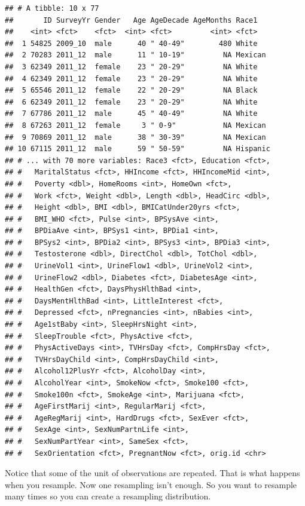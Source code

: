 \documentclass[
]{book}
\begin{document}
\begin{verbatim}
## # A tibble: 10 x 77
##       ID SurveyYr Gender   Age AgeDecade AgeMonths Race1   
##    <int> <fct>    <fct>  <int> <fct>         <int> <fct>   
##  1 54825 2009_10  male      40 " 40-49"        480 White   
##  2 70283 2011_12  male      11 " 10-19"         NA Mexican 
##  3 62349 2011_12  female    23 " 20-29"         NA White   
##  4 62349 2011_12  female    23 " 20-29"         NA White   
##  5 65546 2011_12  female    22 " 20-29"         NA Black   
##  6 62349 2011_12  female    23 " 20-29"         NA White   
##  7 67786 2011_12  male      45 " 40-49"         NA White   
##  8 67263 2011_12  female     3 " 0-9"           NA Mexican 
##  9 70869 2011_12  male      38 " 30-39"         NA Mexican 
## 10 67115 2011_12  male      59 " 50-59"         NA Hispanic
## # ... with 70 more variables: Race3 <fct>, Education <fct>,
## #   MaritalStatus <fct>, HHIncome <fct>, HHIncomeMid <int>,
## #   Poverty <dbl>, HomeRooms <int>, HomeOwn <fct>,
## #   Work <fct>, Weight <dbl>, Length <dbl>, HeadCirc <dbl>,
## #   Height <dbl>, BMI <dbl>, BMICatUnder20yrs <fct>,
## #   BMI_WHO <fct>, Pulse <int>, BPSysAve <int>,
## #   BPDiaAve <int>, BPSys1 <int>, BPDia1 <int>,
## #   BPSys2 <int>, BPDia2 <int>, BPSys3 <int>, BPDia3 <int>,
## #   Testosterone <dbl>, DirectChol <dbl>, TotChol <dbl>,
## #   UrineVol1 <int>, UrineFlow1 <dbl>, UrineVol2 <int>,
## #   UrineFlow2 <dbl>, Diabetes <fct>, DiabetesAge <int>,
## #   HealthGen <fct>, DaysPhysHlthBad <int>,
## #   DaysMentHlthBad <int>, LittleInterest <fct>,
## #   Depressed <fct>, nPregnancies <int>, nBabies <int>,
## #   Age1stBaby <int>, SleepHrsNight <int>,
## #   SleepTrouble <fct>, PhysActive <fct>,
## #   PhysActiveDays <int>, TVHrsDay <fct>, CompHrsDay <fct>,
## #   TVHrsDayChild <int>, CompHrsDayChild <int>,
## #   Alcohol12PlusYr <fct>, AlcoholDay <int>,
## #   AlcoholYear <int>, SmokeNow <fct>, Smoke100 <fct>,
## #   Smoke100n <fct>, SmokeAge <int>, Marijuana <fct>,
## #   AgeFirstMarij <int>, RegularMarij <fct>,
## #   AgeRegMarij <int>, HardDrugs <fct>, SexEver <fct>,
## #   SexAge <int>, SexNumPartnLife <int>,
## #   SexNumPartYear <int>, SameSex <fct>,
## #   SexOrientation <fct>, PregnantNow <fct>, orig.id <chr>
\end{verbatim}



Notice that some of the unit of observations are repeated. That is what happens when you resample. Now one resampling isn't enough. So you want to resample many times so you can create a resampling distribution.
\end{document}
